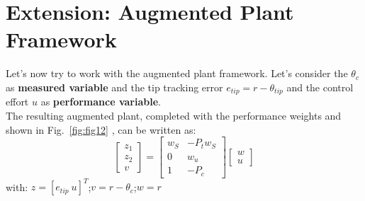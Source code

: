 \documentclass[a4paper, 12pt]{article}
\begin{document}
\section{Extension: Augmented Plant Framework}
Let's now try to work with the augmented plant framework. Let's consider the $\theta_c$ as \textbf{measured variable} and the tip tracking error $e_{tip} = r - \theta_{tip}$ and the control effort $u$ as \textbf{performance variable}.
\\The resulting augmented plant, completed with the performance weights and shown in Fig.~\ref{fig:fig12} , can be written as:
\begin{equation}
\begin{bmatrix}
z_1 \\
z_2 \\
v
\end{bmatrix}
=
\begin{bmatrix}
w_S & -P_t w_S \\
0 & w_u \\
1 & -P_c
\end{bmatrix}
\begin{bmatrix}
w \\
u
\end{bmatrix}
\end{equation}
with: $z = [e_{tip}\ u]^T$;\quad$v = r - \theta_c$;\quad$w = r$
\end{document}
